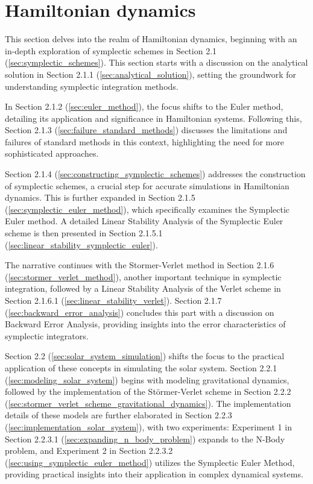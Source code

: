 \documentclass{article}
\begin{document}
\section{Hamiltonian dynamics}
\label{sec:hamiltonian_dynamics}

This section delves into the realm of Hamiltonian dynamics, beginning with an in-depth exploration of symplectic schemes in Section 2.1 (\ref{sec:symplectic_schemes}). This section starts with a discussion on the analytical solution in Section 2.1.1 (\ref{sec:analytical_solution}), setting the groundwork for understanding symplectic integration methods.

In Section 2.1.2 (\ref{sec:euler_method}), the focus shifts to the Euler method, detailing its application and significance in Hamiltonian systems. Following this, Section 2.1.3 (\ref{sec:failure_standard_methods}) discusses the limitations and failures of standard methods in this context, highlighting the need for more sophisticated approaches.

Section 2.1.4 (\ref{sec:constructing_symplectic_schemes}) addresses the construction of symplectic schemes, a crucial step for accurate simulations in Hamiltonian dynamics. This is further expanded in Section 2.1.5 (\ref{sec:symplectic_euler_method}), which specifically examines the Symplectic Euler method. A detailed Linear Stability Analysis of the Symplectic Euler scheme is then presented in Section 2.1.5.1 (\ref{sec:linear_stability_symplectic_euler}).

The narrative continues with the Stormer-Verlet method in Section 2.1.6 (\ref{sec:stormer_verlet_method}), another important technique in symplectic integration, followed by a Linear Stability Analysis of the Verlet scheme in Section 2.1.6.1 (\ref{sec:linear_stability_verlet}). Section 2.1.7 (\ref{sec:backward_error_analysis}) concludes this part with a discussion on Backward Error Analysis, providing insights into the error characteristics of symplectic integrators.

Section 2.2 (\ref{sec:solar_system_simulation}) shifts the focus to the practical application of these concepts in simulating the solar system. Section 2.2.1 (\ref{sec:modeling_solar_system}) begins with modeling gravitational dynamics, followed by the implementation of the Störmer-Verlet scheme in Section 2.2.2 (\ref{sec:stormer_verlet_scheme_gravitational_dynamics}). The implementation details of these models are further elaborated in Section 2.2.3 (\ref{sec:implementation_solar_system}), with two experiments: Experiment 1 in Section 2.2.3.1 (\ref{sec:expanding_n_body_problem}) expands to the N-Body problem, and Experiment 2 in Section 2.2.3.2 (\ref{sec:using_symplectic_euler_method}) utilizes the Symplectic Euler Method, providing practical insights into their application in complex dynamical systems.
\end{document}
